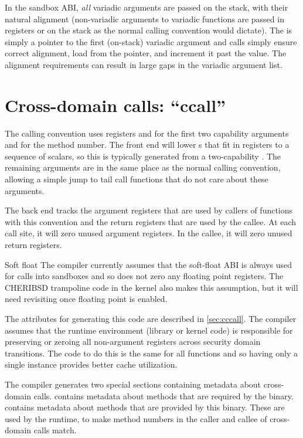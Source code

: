 In the sandbox ABI, \textit{all} variadic arguments are passed on the stack, with their natural alignment (non-variadic arguments to variadic functions are passed in registers or on the stack as the normal calling convention would dictate).
The  is simply a pointer to the first (on-stack) variadic argument and  calls simply ensure correct alignment, load from the pointer, and increment it past the value.
The alignment requirements can result in large gaps in the variadic argument list.


\section{Cross-domain calls: ``ccall''}

The  calling convention uses registers  and  for the first two capability arguments and  for the method number.
The front end will lower s that fit in registers to a sequence of scalars, so this is typically generated from a two-capability .
The remaining arguments are in the same place as the normal calling convention, allowing a simple jump to tail call functions that do not care about these arguments.

The back end tracks the argument registers that are used by callers of functions with this convention and the return registers that are used by the callee.
At each call site, it will zero unused argument registers.
In the callee, it will zero unused return registers.

\begin{notebox}{Soft float}
	The compiler currently assumes that the soft-float ABI is always used for calls into sandboxes and so does not zero any floating point registers.
	The CHERIBSD trampoline code in the kernel also makes this assumption, but it will need revisiting once floating point is enabled.
\end{notebox}

The attributes for generating this code are described in \autoref{sec:cccall}.
The compiler assumes that the runtime environment (library or kernel code) is responsible for preserving or zeroing all non-argument registers across security domain transitions.
The code to do this is the same for all functions and so having only a single instance provides better cache utilization.

The compiler generates two special sections containing metadata about cross-domain calls.
 contains metadata about methods that are required by the binary.
 contains metadata about methods that are provided by this binary.
These are used by the  runtime, to make method numbers in the caller and callee of cross-domain calls match.

